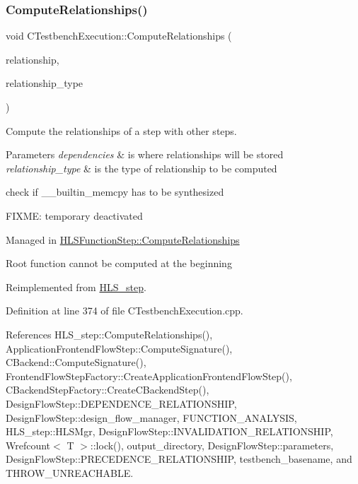 \subsubsection{\texorpdfstring{Compute\+Relationships()}{ComputeRelationships()}}
{\footnotesize\ttfamily void C\+Testbench\+Execution\+::\+Compute\+Relationships (\begin{DoxyParamCaption}\item[{\hyperlink{classDesignFlowStepSet}{Design\+Flow\+Step\+Set} \&}]{relationship,  }\item[{const \hyperlink{classDesignFlowStep_a723a3baf19ff2ceb77bc13e099d0b1b7}{Design\+Flow\+Step\+::\+Relationship\+Type}}]{relationship\+\_\+type }\end{DoxyParamCaption})\hspace{0.3cm}{\ttfamily [virtual]}}



Compute the relationships of a step with other steps. 


\begin{DoxyParams}{Parameters}
{\em dependencies} & is where relationships will be stored \\
\hline
{\em relationship\+\_\+type} & is the type of relationship to be computed \\
\hline
\end{DoxyParams}
check if \+\_\+\+\_\+builtin\+\_\+memcpy has to be synthesized

F\+I\+X\+ME\+: temporary deactivated

Managed in \hyperlink{classHLSFunctionStep_ab3864e8dbd73b0eabc25f386a0cece54}{H\+L\+S\+Function\+Step\+::\+Compute\+Relationships}

Root function cannot be computed at the beginning 

Reimplemented from \hyperlink{classHLS__step_ad5c58777d9b466fb3eee185f6d3ac993}{H\+L\+S\+\_\+step}.



Definition at line 374 of file C\+Testbench\+Execution.\+cpp.



References H\+L\+S\+\_\+step\+::\+Compute\+Relationships(), Application\+Frontend\+Flow\+Step\+::\+Compute\+Signature(), C\+Backend\+::\+Compute\+Signature(), Frontend\+Flow\+Step\+Factory\+::\+Create\+Application\+Frontend\+Flow\+Step(), C\+Backend\+Step\+Factory\+::\+Create\+C\+Backend\+Step(), Design\+Flow\+Step\+::\+D\+E\+P\+E\+N\+D\+E\+N\+C\+E\+\_\+\+R\+E\+L\+A\+T\+I\+O\+N\+S\+H\+IP, Design\+Flow\+Step\+::design\+\_\+flow\+\_\+manager, F\+U\+N\+C\+T\+I\+O\+N\+\_\+\+A\+N\+A\+L\+Y\+S\+IS, H\+L\+S\+\_\+step\+::\+H\+L\+S\+Mgr, Design\+Flow\+Step\+::\+I\+N\+V\+A\+L\+I\+D\+A\+T\+I\+O\+N\+\_\+\+R\+E\+L\+A\+T\+I\+O\+N\+S\+H\+IP, Wrefcount$<$ T $>$\+::lock(), output\+\_\+directory, Design\+Flow\+Step\+::parameters, Design\+Flow\+Step\+::\+P\+R\+E\+C\+E\+D\+E\+N\+C\+E\+\_\+\+R\+E\+L\+A\+T\+I\+O\+N\+S\+H\+IP, testbench\+\_\+basename, and T\+H\+R\+O\+W\+\_\+\+U\+N\+R\+E\+A\+C\+H\+A\+B\+LE.

